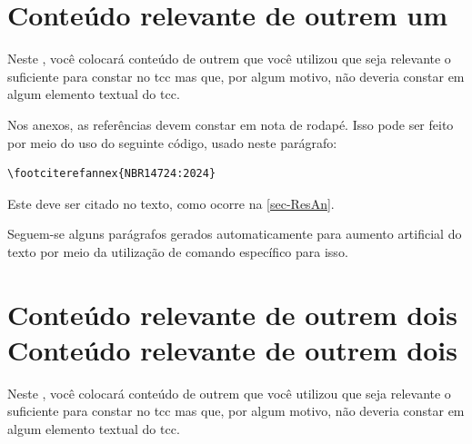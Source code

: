 \begin{anexosenv}

\partanexos

\chapter{Conteúdo relevante de outrem um} %
\label{ane-um}

Neste , você colocará conteúdo de outrem que você utilizou que seja relevante o suficiente para constar no \ac{tcc} mas que, por algum motivo, não deveria constar em algum elemento textual do \ac{tcc}.

Nos anexos, as referências devem constar em nota de rodapé. Isso pode ser feito por meio do uso do seguinte código, usado neste parágrafo:
\begin{verbatim}
\footciterefannex{NBR14724:2024}
\end{verbatim}

Este  deve ser citado no texto, como ocorre na \autoref{sec-ResAn}.

Seguem-se alguns parágrafos gerados automaticamente para aumento artificial do texto por meio da utilização de comando específico para isso.

\lipsum[23-28]

\chapter{Conteúdo relevante de outrem dois Conteúdo relevante de outrem dois} %
\label{ane-dois}

Neste , você colocará conteúdo de outrem que você utilizou que seja relevante o suficiente para constar no \ac{tcc} mas que, por algum motivo, não deveria constar em algum elemento textual do \ac{tcc}.


\end{anexosenv}
